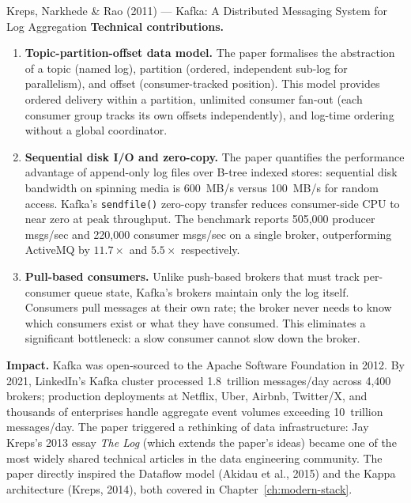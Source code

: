 \begin{researchspotlight}{Kreps, Narkhede \& Rao (2011) --- Kafka: A
Distributed Messaging System for Log Aggregation}
\medskip
\textbf{Technical contributions.}
\begin{enumerate}
  \item \textbf{Topic-partition-offset data model.} The paper formalises
        the abstraction of a topic (named log), partition (ordered,
        independent sub-log for parallelism), and offset (consumer-tracked
        position). This model provides ordered delivery within a partition,
        unlimited consumer fan-out (each consumer group tracks its own
        offsets independently), and log-time ordering without a global
        coordinator.
  \item \textbf{Sequential disk I/O and zero-copy.} The paper quantifies
        the performance advantage of append-only log files over B-tree
        indexed stores: sequential disk bandwidth on spinning media is
        600~MB/s versus 100~MB/s for random access. Kafka's \texttt{sendfile()}
        zero-copy transfer reduces consumer-side CPU to near zero at peak
        throughput. The benchmark reports 505{,}000 producer msgs/sec and
        220{,}000 consumer msgs/sec on a single broker, outperforming
        ActiveMQ by $11.7\times$ and $5.5\times$ respectively.
  \item \textbf{Pull-based consumers.} Unlike push-based brokers that must
        track per-consumer queue state, Kafka's brokers maintain only the
        log itself. Consumers pull messages at their own rate; the broker
        never needs to know which consumers exist or what they have consumed.
        This eliminates a significant bottleneck: a slow consumer cannot
        slow down the broker.
\end{enumerate}

\medskip
\textbf{Impact.} Kafka was open-sourced to the Apache Software Foundation
in 2012. By 2021, LinkedIn's Kafka cluster processed 1.8~trillion
messages/day across 4{,}400 brokers; production deployments at Netflix,
Uber, Airbnb, Twitter/X, and thousands of enterprises handle aggregate
event volumes exceeding 10~trillion messages/day. The paper triggered
a rethinking of data infrastructure: Jay Kreps's 2013 essay \textit{The
Log} (which extends the paper's ideas) became one of the most widely
shared technical articles in the data engineering community. The paper
directly inspired the Dataflow model (Akidau et al., 2015) and the
Kappa architecture (Kreps, 2014), both covered in Chapter~\ref{ch:modern-stack}.
\end{researchspotlight}

